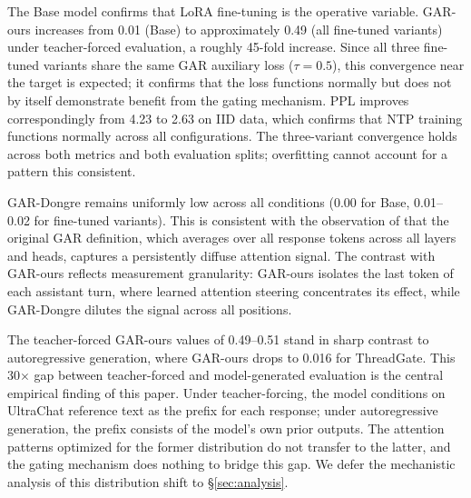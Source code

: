 The Base model confirms that LoRA fine-tuning is the operative variable. GAR-ours increases from 0.01 (Base) to approximately 0.49 (all fine-tuned variants) under teacher-forced evaluation, a roughly 45-fold increase. Since all three fine-tuned variants share the same GAR auxiliary loss ($\tau = 0.5$), this convergence near the target is expected; it confirms that the loss functions normally but does not by itself demonstrate benefit from the gating mechanism. PPL improves correspondingly from 4.23 to 2.63 on IID data, which confirms that NTP training functions normally across all configurations. The three-variant convergence holds across both metrics and both evaluation splits; overfitting cannot account for a pattern this consistent.

GAR-Dongre remains uniformly low across all conditions (0.00 for Base, 0.01--0.02 for fine-tuned variants). This is consistent with the observation of \citet{dongre2026attention} that the original GAR definition, which averages over all response tokens across all layers and heads, captures a persistently diffuse attention signal. The contrast with GAR-ours reflects measurement granularity: GAR-ours isolates the last token of each assistant turn, where learned attention steering concentrates its effect, while GAR-Dongre dilutes the signal across all positions.

The teacher-forced GAR-ours values of 0.49--0.51 stand in sharp contrast to autoregressive generation, where GAR-ours drops to 0.016 for ThreadGate. This 30$\times$ gap between teacher-forced and model-generated evaluation is the central empirical finding of this paper. Under teacher-forcing, the model conditions on UltraChat reference text as the prefix for each response; under autoregressive generation, the prefix consists of the model's own prior outputs. The attention patterns optimized for the former distribution do not transfer to the latter, and the gating mechanism does nothing to bridge this gap. We defer the mechanistic analysis of this distribution shift to \S\ref{sec:analysis}.

